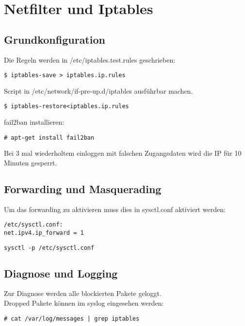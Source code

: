 \chapter{Netfilter und Iptables}
\section{Grundkonfiguration}
Die Regeln werden in /etc/iptables.test.rules geschrieben:

\begin{lstlisting}[style=Bash]
$ iptables-save > iptables.ip.rules
\end{lstlisting}
Script in /etc/network/if-pre-up.d/iptables ausführbar machen.\\
\begin{lstlisting}[style=Bash]
$ iptables-restore<iptables.ip.rules
\end{lstlisting}
fail2ban installieren:
\begin{lstlisting}[style=Bash]
# apt-get install fail2ban
\end{lstlisting}
Bei 3 mal wiederholtem einloggen mit falschen Zugangsdaten wird die IP für 10 Minuten gesperrt.
\section{Forwarding und Masquerading}
Um das forwarding zu aktivieren muss dies in sysctl.conf aktiviert werden:
\begin{lstlisting}[style=Bash]
/etc/sysctl.conf:
net.ipv4.ip_forward = 1
\end{lstlisting}
\begin{lstlisting}[style=Bash]
sysctl -p /etc/sysctl.conf
\end{lstlisting}
\section{Diagnose und Logging}
Zur Diagnose werden alle blockierten Pakete geloggt.\\
Dropped Pakete können im syslog eingesehen werden:
\begin{lstlisting}[style=Bash]
# cat /var/log/messages | grep iptables
\end{lstlisting}
